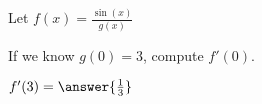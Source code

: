 \documentclass{ximera}
\author{Steven Gubkin}
\begin{document}
\begin{exercise}


Let $f(x) = \frac{\sin(x)}{g(x)} $

If we know $g(0) = 3$, compute $f'(0)$.

\begin{prompt}
	$f'(3) = \answer{\frac{1}{3}}$
\end{prompt}

\end{exercise}
\end{document}
